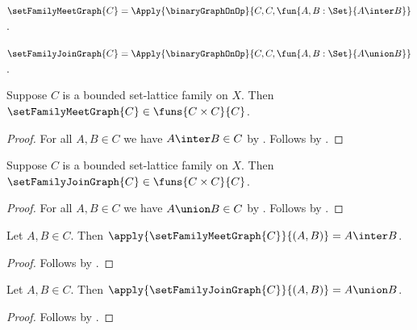 \begin{definition}\label{set_family_meet_graph}
    $\setFamilyMeetGraph{C}=
        \Apply{\binaryGraphOnOp}
            {C,C,\fun{A,B:\Set}{A\inter B}}$.
\end{definition}

\begin{definition}\label{set_family_join_graph}
    $\setFamilyJoinGraph{C}=
        \Apply{\binaryGraphOnOp}
            {C,C,\fun{A,B:\Set}{A\union B}}$.
\end{definition}

\begin{proposition}\label{set_family_meet_graph_type}
    Suppose $C$ is a bounded set-lattice family on $X$.
    Then $\setFamilyMeetGraph{C}\in\funs{C\times C}{C}$.
\end{proposition}
\begin{proof}
    For all $A,B\in C$ we have $A\inter B\in C$ by
        .
    Follows by
        .
\end{proof}

\begin{proposition}\label{set_family_join_graph_type}
    Suppose $C$ is a bounded set-lattice family on $X$.
    Then $\setFamilyJoinGraph{C}\in\funs{C\times C}{C}$.
\end{proposition}
\begin{proof}
    For all $A,B\in C$ we have $A\union B\in C$ by
        .
    Follows by
        .
\end{proof}

\begin{proposition}\label{set_family_meet_graph_apply}
    Let $A,B\in C$.
    Then $\apply{\setFamilyMeetGraph{C}}{(A,B)}=A\inter B$.
\end{proposition}
\begin{proof}
    Follows by
        .
\end{proof}

\begin{proposition}\label{set_family_join_graph_apply}
    Let $A,B\in C$.
    Then $\apply{\setFamilyJoinGraph{C}}{(A,B)}=A\union B$.
\end{proposition}
\begin{proof}
    Follows by
        .
\end{proof}


